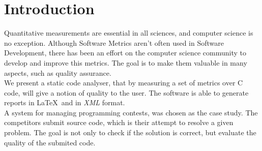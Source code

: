 \section{Introduction}
Quantitative measurements are essential in all sciences, and computer science is no exception.
Although Software Metrics aren't often used in Software Development, there has been an effort on the computer science community to develop and improve this metrics. 
The goal is to make them valuable in many aspects, such as quality assurance.\\
We present a static code analyser, that by measuring a set of metrics over C code, will give a notion of quality to the user. The software is able to generate
reports in \LaTeX~and in \textit{XML} format.\\
A system for managing programming contests, was chosen as the case study.
The competitors submit source code, which is their attempt to resolve a given problem.
The goal is not only to check if the solution is correct, but evaluate the quality of the submited code.\\

